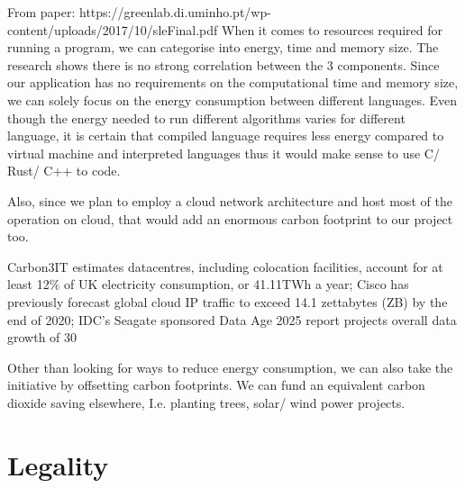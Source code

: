 From paper: https://greenlab.di.uminho.pt/wp-content/uploads/2017/10/sleFinal.pdf
When it comes to resources required for running a program, we can categorise into energy, time and memory size. The research shows there is no strong correlation between the 3 components. Since our application has no requirements on the computational time and memory size, we can solely focus on the energy consumption between different languages. Even though the energy needed to run different algorithms varies for different language, it is certain that compiled language requires less energy compared to virtual machine and interpreted languages thus it would make sense to use C/ Rust/ C++ to code.

Also, since we plan to employ a cloud network architecture and host most of the operation on cloud, that would add an enormous carbon footprint to our project too.

Carbon3IT estimates datacentres, including colocation facilities, account for at least 12\% of UK electricity consumption, or 41.11TWh a year; Cisco has previously forecast global cloud IP traffic to exceed 14.1 zettabytes (ZB) by the end of 2020; IDC’s Seagate sponsored Data Age 2025 report projects overall data growth of 30%

Other than looking for ways to reduce energy consumption, we can also take the initiative by offsetting carbon footprints. We can fund an equivalent carbon dioxide saving elsewhere, I.e. planting trees, solar/ wind power projects.


\section{Legality}
